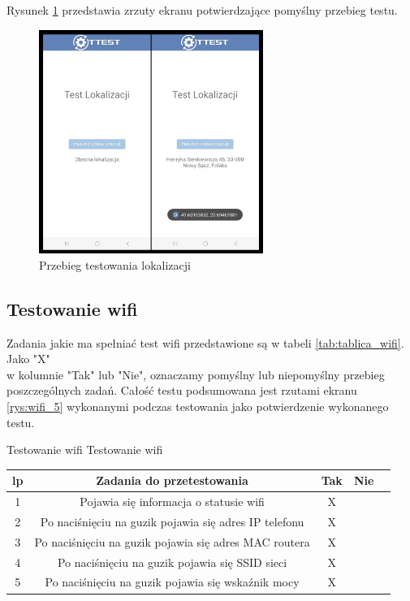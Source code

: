 Rysunek \ref{rys:gps_5} przedstawia zrzuty ekranu potwierdzające pomyślny przebieg testu.

\begin{figure}[!hbt]
	\begin{center}
		\includegraphics[angle=360, width=0.65\textwidth]{rys/punkt5/gps.jpg}
		\caption{Przebieg testowania lokalizacji}
		\label{rys:gps_5}
	\end{center}
\end{figure} 

\newpage


\subsection{Testowanie wifi}  

\hspace{0.60cm}Zadania jakie ma spełniać test wifi przedstawione są w tabeli \ref{tab:tablica_wifi}. Jako "X" \\ w kolumnie "Tak" lub "Nie", oznaczamy pomyślny lub niepomyślny przebieg poszczególnych zadań. Całość testu podsumowana jest rzutami ekranu \ref{rys:wifi_5} wykonanymi podczas testowania jako potwierdzenie wykonanego testu.

\begin{tabela}
	{Testowanie wifi}	%
	{Testowanie wifi}	%
	{
		\begin{tabular}{|c|c|c|c|c|} \hline
			\textbf{lp} & \textbf{Zadania do przetestowania} & \textbf{Tak} & \textbf{Nie} \\ \hline
			1 & Pojawia się informacja o statusie wifi & X & ~ \\ \hline
			2 & Po naciśnięciu na guzik pojawia się adres IP telefonu & X & ~ \\ \hline
			3 & Po naciśnięciu na guzik pojawia się adres MAC routera & X & ~ \\ \hline
			4 & Po naciśnięciu na guzik pojawia się SSID sieci & X & ~ \\ \hline
			5 & Po naciśnięciu na guzik pojawia się wskaźnik mocy & X & ~ \\ \hline
	\end{tabular}	}
	\label{tab:tablica_wifi}
\end{tabela}

